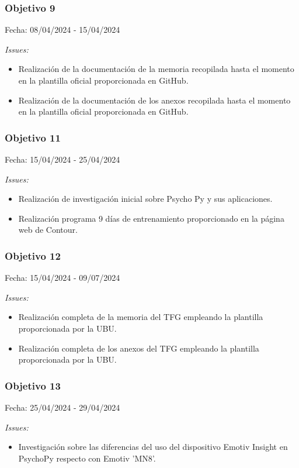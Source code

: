 \subsubsection{Objetivo 9}
Fecha: 08/04/2024 - 15/04/2024

\textit{Issues:}
\begin{itemize}
    \item Realización de la documentación de la memoria recopilada hasta el momento en la plantilla oficial proporcionada en GitHub.
    \item Realización de la documentación de los anexos recopilada hasta el momento en la plantilla oficial proporcionada en GitHub.
\end{itemize}

\subsubsection{Objetivo 11}
Fecha: 15/04/2024 - 25/04/2024

\textit{Issues:}
\begin{itemize}
    \item Realización de investigación inicial sobre Psycho Py y sus aplicaciones.
    \item Realización programa 9 días de entrenamiento proporcionado en la página web de Contour.
\end{itemize}

\subsubsection{Objetivo 12}
Fecha: 15/04/2024 - 09/07/2024

\textit{Issues:}
\begin{itemize}
    \item Realización completa de la memoria del TFG empleando la plantilla proporcionada por la UBU.
    \item Realización completa de los anexos del TFG empleando la plantilla proporcionada por la UBU.
\end{itemize}

\subsubsection{Objetivo 13}
Fecha: 25/04/2024 - 29/04/2024

\textit{Issues:}
\begin{itemize}
    \item Investigación sobre las diferencias del uso del dispositivo Emotiv Insight en PsychoPy respecto con Emotiv 'MN8'.
\end{itemize}

